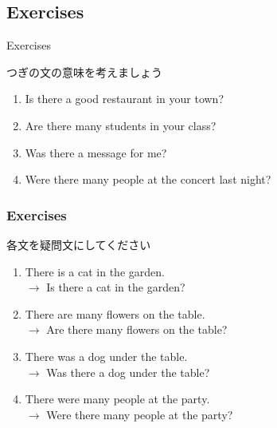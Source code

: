 \documentclass[aspectratio=169]{beamer}
\newcommand{\myaudio}[1]{\href{#1}{\faVolumeUp}}
\begin{document}
 \subsection{Exercises}
\begin{frame}[plain]{Exercises}

つぎの文の意味を考えましょう\pause
\begin{enumerate}[<+->]
 \item Is there a good restaurant in your town?
 \item Are there many students in your class?
 \item Was there a message for me?
 \item Were there many people at the concert last night?
\end{enumerate}

\hfill\myaudio{./audio/001_there_is_07.mp3}
\end{frame}
\begin{frame}[plain]\frametitle{Exercises}
各文を疑問文にしてください\hfill\myaudio{./audio/001_there_is_08.mp3}\pause

  \begin{enumerate}
   \item There is a cat in the garden.\\
         \pause
         $\longrightarrow$ Is there a cat in the garden?\pause
   \item There are many flowers on the table.\\
         \pause
         $\longrightarrow$ Are there many flowers on the table?\pause
   \item There was a dog under the table.\\
         \pause
         $\longrightarrow$ Was there a dog under the table?\pause
   \item There were many people at the party.\\
         \pause
         $\longrightarrow$ Were there many people at the party?\pause
  \end{enumerate}




\end{frame}
\end{document}
